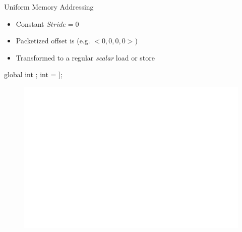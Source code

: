\begin{frame}[fragile]{Uniform Memory Addressing}

\begin{itemize}
    \item Constant $Stride = 0$
    \item Packetized offset is  (e.g. $<0, 0, 0, 0>$)
    \item Transformed to a regular \emph{scalar} load or store
\end{itemize}

\begin{minipage}[t]{0.40\linewidth}
    \vspace{0.1ex}
    \begin{codebox}[commandchars=\\\[\]]

global int \uniform[*src];
int \uniform[x] = \uniform[src]\idx[\uniform[0]];






    \end{codebox}
\end{minipage}
\begin{minipage}[t]{0.49\linewidth}
    \begin{figure}
        \includegraphics[scale=0.5]{images/uniform-access.pdf}
    \end{figure}
\end{minipage}

\end{frame}


